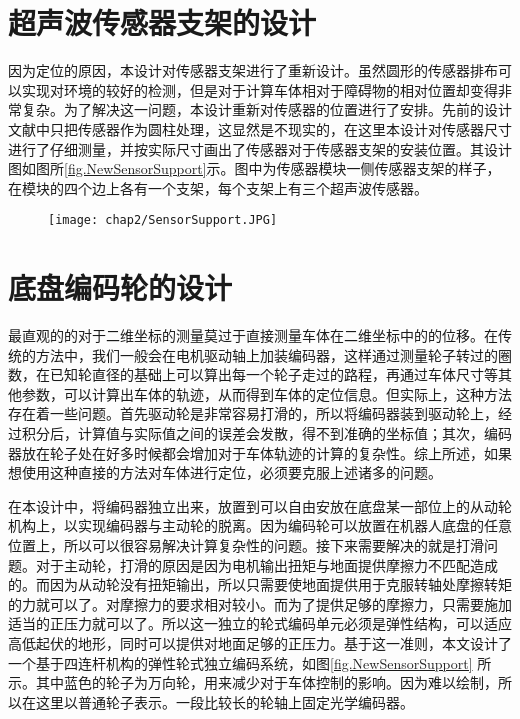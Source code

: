 \section{超声波传感器支架的设计}
因为定位的原因，本设计对传感器支架进行了重新设计。虽然圆形的传感器排布可以实现对环境的较好的检测，但是对于计算车体相对于障碍物的相对位置却变得非常复杂。为了解决这一问题，本设计重新对传感器的位置进行了安排。先前的设计文献中只把传感器作为圆柱处理，这显然是不现实的，在这里本设计对传感器尺寸进行了仔细测量，并按实际尺寸画出了传感器对于传感器支架的安装位置。其设计图如图所\ref{fig.NewSensorSupport}示。图中为传感器模块一侧传感器支架的样子，在模块的四个边上各有一个支架，每个支架上有三个超声波传感器。
\begin{figure}[!htp]
  \centering
  \texttt{[image: chap2/SensorSupport.JPG]}
\end{figure}
\section{底盘编码轮的设计}
最直观的的对于二维坐标的测量莫过于直接测量车体在二维坐标中的的位移。在传统的方法中，我们一般会在电机驱动轴上加装编码器，这样通过测量轮子转过的圈数，在已知轮直径的基础上可以算出每一个轮子走过的路程，再通过车体尺寸等其他参数，可以计算出车体的轨迹，从而得到车体的定位信息。但实际上，这种方法存在着一些问题。首先驱动轮是非常容易打滑的，所以将编码器装到驱动轮上，经过积分后，计算值与实际值之间的误差会发散，得不到准确的坐标值；其次，编码器放在轮子处在好多时候都会增加对于车体轨迹的计算的复杂性。综上所述，如果想使用这种直接的方法对车体进行定位，必须要克服上述诸多的问题。

在本设计中，将编码器独立出来，放置到可以自由安放在底盘某一部位上的从动轮机构上，以实现编码器与主动轮的脱离。因为编码轮可以放置在机器人底盘的任意位置上，所以可以很容易解决计算复杂性的问题。接下来需要解决的就是打滑问题。对于主动轮，打滑的原因是因为电机输出扭矩与地面提供摩擦力不匹配造成的。而因为从动轮没有扭矩输出，所以只需要使地面提供用于克服转轴处摩擦转矩的力就可以了。对摩擦力的要求相对较小。而为了提供足够的摩擦力，只需要施加适当的正压力就可以了。所以这一独立的轮式编码单元必须是弹性结构，可以适应高低起伏的地形，同时可以提供对地面足够的正压力。基于这一准则，本文设计了一个基于四连杆机构的弹性轮式独立编码系统，如图\ref{fig.NewSensorSupport} 所示。其中蓝色的轮子为万向轮，用来减少对于车体控制的影响。因为难以绘制，所以在这里以普通轮子表示。一段比较长的轮轴上固定光学编码器。
\begin{figure}
  \centering
\end{figure}
